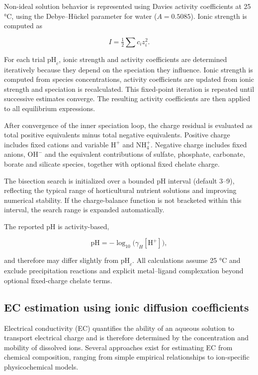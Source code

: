 \documentclass[
  letterpaper,
  DIV=11,
  numbers=noendperiod]{scrreprt}
\begin{document}
Non-ideal solution behavior is represented using Davies activity
coefficients at 25 °C, using the Debye--Hückel parameter for water
(\(A = 0.5085\)). Ionic strength is computed as

\[
I = \tfrac{1}{2} \sum c_i z_i^2.
\]

For each trial \(\mathrm{pH}_c\), ionic strength and activity
coefficients are determined iteratively because they depend on the
speciation they influence. Ionic strength is computed from species
concentrations, activity coefficients are updated from ionic strength
and speciation is recalculated. This fixed-point iteration is repeated
until successive estimates converge. The resulting activity coefficients
are then applied to all equilibrium expressions.

After convergence of the inner speciation loop, the charge residual is
evaluated as total positive equivalents minus total negative
equivalents. Positive charge includes fixed cations and variable
\(\mathrm{H}^+\) and \(\mathrm{NH}_4^+\). Negative charge includes fixed
anions, \(\mathrm{OH}^-\) and the equivalent contributions of sulfate,
phosphate, carbonate, borate and silicate species, together with
optional fixed chelate charge.

The bisection search is initialized over a bounded pH interval (default
3--9), reflecting the typical range of horticultural nutrient solutions
and improving numerical stability. If the charge-balance function is not
bracketed within this interval, the search range is expanded
automatically.

The reported pH is activity-based,

\[
\mathrm{pH} = -\log_{10}\!\bigl(\gamma_H [\mathrm{H}^+]\bigr),
\]

and therefore may differ slightly from \(\mathrm{pH}_c\). All
calculations assume 25 °C and exclude precipitation reactions and
explicit metal--ligand complexation beyond optional fixed-charge chelate
terms.

\subsection{EC estimation using ionic diffusion
coefficients}\label{ec-estimation-using-ionic-diffusion-coefficients}

Electrical conductivity (EC) quantifies the ability of an aqueous
solution to transport electrical charge and is therefore determined by
the concentration and mobility of dissolved ions. Several approaches
exist for estimating EC from chemical composition, ranging from simple
empirical relationships to ion-specific physicochemical models.
\end{document}
